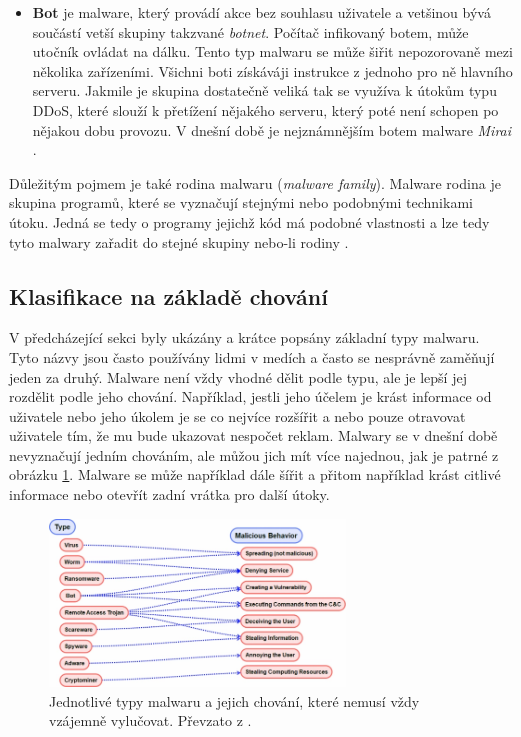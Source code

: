 \begin{itemize}
    \item \textbf{Bot} \label{botnets} je malware, který provádí akce bez souhlasu uživatele a vetšinou bývá součástí vetší skupiny takzvané \textit{botnet}. Počítač infikovaný botem, může utočník ovládat na dálku. Tento typ malwaru se může šiřit nepozorovaně mezi několika zařízeními. Všichni boti získáváji instrukce z jednoho pro ně hlavního serveru. Jakmile je skupina dostatečně veliká tak se využíva k útokům typu DDoS, které slouží k přetížení nějakého serveru, který poté není schopen po nějakou dobu provozu. V dnešní době je nejznámnějším botem malware \textit{Mirai} \cite{article_malware,malware_wiki}.
\end{itemize}

\label{family}Důležitým pojmem je také rodina malwaru (\textit{malware family}). Malware rodina je skupina programů, které se vyznačují stejnými nebo podobnými technikami útoku. Jedná se tedy o programy jejichž kód má podobné vlastnosti a lze tedy tyto malwary zařadit do stejné skupiny nebo-li rodiny \cite{malware_fam}. 

\subsection*{Klasifikace na základě chování}
V předcházející sekci byly ukázány a krátce popsány základní typy malwaru. Tyto názvy jsou často používány lidmi v medích a často se nesprávně zaměňují jeden za druhý.
Malware není vždy vhodné dělit podle typu, ale je lepší jej rozdělit podle jeho chování. Například, jestli jeho účelem je krást informace od uživatele nebo jeho úkolem je se 
co nejvíce rozšířit a nebo pouze otravovat uživatele tím, že mu bude ukazovat nespočet reklam. Malwary se v dnešní době nevyznačují jedním chováním, ale můžou jich mít více najednou, jak 
je patrné z obrázku \ref{behavior}. Malware se může například dále šířit a přitom například krást citlivé informace nebo otevřít zadní vrátka pro další útoky. 

\begin{figure}[h]
	\centering
        \includegraphics[width=0.7\textwidth]{obrazky/behavior.png}
	\caption{Jednotlivé typy malwaru a jejich chování, které nemusí vždy vzájemně vylučovat. Převzato z \cite{article_malware}.}
    \label{behavior}
\end{figure}
\newpage

